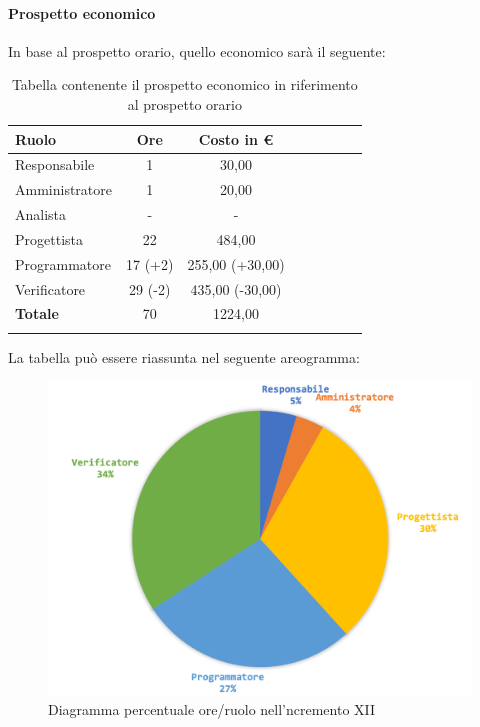 		\paragraph{Prospetto economico}
		In base al prospetto orario, quello economico sarà il seguente: 
		
		\begin{longtable}{|l|c|c|c|c|c|c|c|}
			\hline
			\rowcolor{lighter-grayer}
			\textbf{Ruolo} & \textbf{Ore} & \textbf{Costo in € } \\
			\hline
			\endfirsthead
			
			\hline
			Responsabile 	    & 1 & 30,00\\
			\hline 
			\hline
			Amministratore	   & 1 & 20,00\\
			\hline
			\hline
			Analista 				& - & - \\
			\hline
			\hline
			Progettista 		   & 22 & 484,00\\
			\hline
			\hline
			Programmatore 	  & 17 (+2) & 255,00 (+30,00)\\
			\hline
			\hline
			Verificatore 		   & 29 (-2) & 435,00 (-30,00)\\
			\hline
			\textbf{Totale} 	 & 70 & 1224,00\\
			\hline
			\caption{Tabella contenente il prospetto economico in riferimento al prospetto orario}
		\end{longtable}
		\pagebreak
		La tabella può essere riassunta nel seguente areogramma:
		\begin{figure}[H]
			\centering
			\includegraphics[width=0.8\linewidth]{./images/consuntivo/ConsIncr12-2.png}
			\caption{Diagramma percentuale ore/ruolo nell'ncremento XII}
			\label{fig:consuntivo diagramma costi ruolo incremento XII}
		\end{figure}
		
